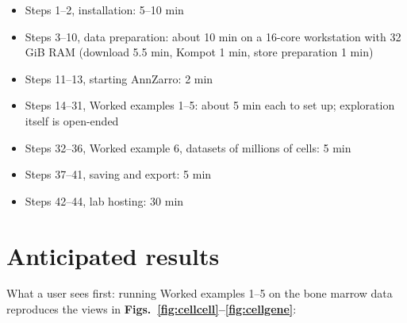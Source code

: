 \begin{itemize}
\tightlist
\item
  Steps 1--2, installation: 5--10 min
\item
  Steps 3--10, data preparation: about 10 min on a 16-core workstation with 32 GiB RAM (download 5.5 min, Kompot 1 min, store preparation 1 min)
\item
  Steps 11--13, starting AnnZarro: 2 min
\item
  Steps 14--31, Worked examples 1--5: about 5 min each to set up; exploration itself is open-ended
\item
  Steps 32--36, Worked example 6, datasets of millions of cells: 5 min
\item
  Steps 37--41, saving and export: 5 min
\item
  Steps 42--44, lab hosting: 30 min
\end{itemize}

\section{Anticipated results}

What a user sees first: running Worked examples 1--5 on the bone marrow data reproduces the views in \textbf{Figs.~\ref{fig:cellcell}--\ref{fig:cellgene}}:

